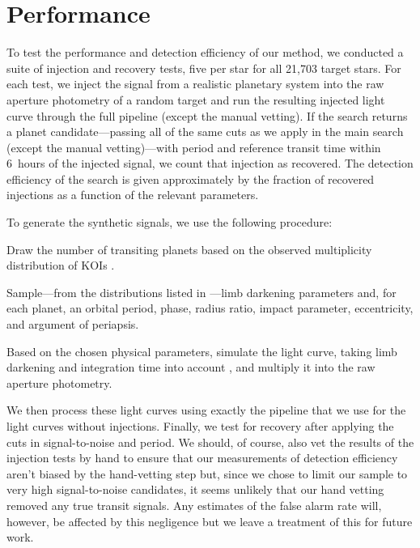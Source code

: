 \section{Performance}

To test the performance and detection efficiency of our method, we conducted a
suite of injection and recovery tests, five per
star for all 21,703 target stars.
For each test, we inject the signal from a realistic planetary system into the
raw aperture photometry of a random target and run the resulting injected
light curve through the full pipeline (except the manual vetting).
If the search returns a planet candidate---passing all of the same cuts as we
apply in the main search (except the manual vetting)---with period and
reference transit time within 6~hours of the injected signal, we count that
injection as recovered.
The detection efficiency of the search is given approximately by the fraction
of recovered injections as a function of the relevant parameters.

To generate the synthetic signals, we use the following procedure:
\begin{enumerate}
{\item Draw the number of transiting planets based on the observed
multiplicity distribution of KOIs \citep{Burke:2014}.}
{\item Sample---from the distributions listed in
---limb darkening parameters and, for each planet, an orbital
period, phase, radius ratio, impact parameter, eccentricity, and argument of
periapsis.}
{\item Based on the chosen physical parameters, simulate the light curve,
taking limb darkening and integration time into account \citep{Mandel:2002,
Kipping:2010}, and multiply it into the raw aperture photometry.}
\end{enumerate}
We then process these light curves using exactly the pipeline that we use for
the light curves without injections.
Finally, we test for recovery after applying the cuts in signal-to-noise and
period.
We should, of course, also vet the results of the injection tests by hand
to ensure that our measurements of detection efficiency aren't biased by the
hand-vetting
step but, since we chose to limit our sample to very high signal-to-noise
candidates, it seems unlikely that our hand vetting removed any true transit
signals.
Any estimates of the false alarm rate will, however, be affected by this
negligence but we leave a treatment of this for future work.

